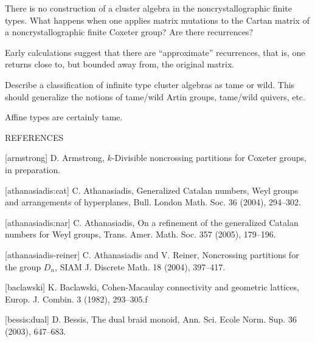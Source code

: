 \documentclass[12pt,letterpaper, reqno]{amsart}
\begin{document}
\begin{problemblock}

\begin{problem}[6.4]  
There is no construction of a cluster algebra in the noncrystallographic finite types.
What happens when one applies matrix mutations to the Cartan matrix of a noncrystallographic finite Coxeter group? Are there recurrences?
\end{problem}

\begin{remark}
Early calculations suggest that
there are ``approximate'' recurrences, that is, one returns close to,
but bounded away from, the original matrix.
\end{remark}

\end{problemblock}

\begin{problemblock}
\begin{problem}[6.5] Describe a classification of infinite type cluster algebras as tame or wild. This should generalize the notions of tame/wild Artin groups, tame/wild quivers, etc.
\end{problem}

\begin{remark}
Affine types are certainly tame.
\end{remark}

\end{problemblock}



REFERENCES

[armstrong]
D. Armstrong, $k$-Divisible noncrossing partitions for Coxeter groups, in preparation.

[athanasiadis:cat]
C. Athanasiadis, Generalized Catalan numbers, Weyl groups and arrangements of hyperplanes, Bull. London Math. Soc. {36} (2004), 294--302.

[athanasiadis:nar]
C. Athanasiadis, On a refinement of the generalized Catalan numbers for Weyl groups, Trans. Amer. Math. Soc. {357} (2005), 179--196.

[athanasiadis-reiner]
C. Athanasiadis and V. Reiner, Noncrossing partitions for the group $D_n$, SIAM J. Discrete Math. {18} (2004), 397--417.

[baclawski]
K. Baclawski, Cohen-Macaulay connectivity and geometric lattices, Europ. J. Combin. {3} (1982), 293--305.f

[bessis:dual]
D. Bessis, The dual braid monoid, Ann. Sci. Ecole Norm. Sup. {36} (2003), 647--683.
\end{document}
